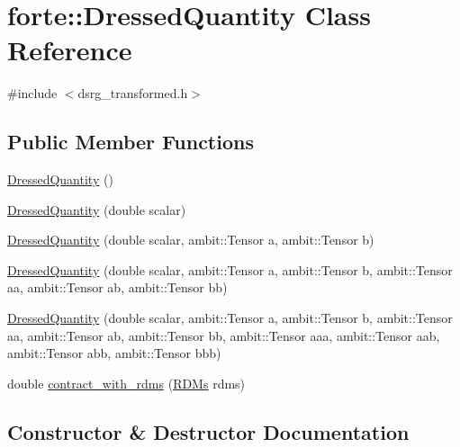\hypertarget{classforte_1_1_dressed_quantity}{}\section{forte\+:\+:Dressed\+Quantity Class Reference}
\label{classforte_1_1_dressed_quantity}


{\ttfamily \#include $<$dsrg\+\_\+transformed.\+h$>$}

\subsection*{Public Member Functions}
\begin{DoxyCompactItemize}
\item 
\mbox{\hyperlink{classforte_1_1_dressed_quantity_a3fa0227d12e055f33566c46750898d10}{Dressed\+Quantity}} ()
\item 
\mbox{\hyperlink{classforte_1_1_dressed_quantity_a7f60134c01eeddca427024865f315d20}{Dressed\+Quantity}} (double scalar)
\item 
\mbox{\hyperlink{classforte_1_1_dressed_quantity_aa3daf37f0ebc740b33f824beb7a92914}{Dressed\+Quantity}} (double scalar, ambit\+::\+Tensor a, ambit\+::\+Tensor b)
\item 
\mbox{\hyperlink{classforte_1_1_dressed_quantity_a13194b9e4e59de0d776ec546d24917a6}{Dressed\+Quantity}} (double scalar, ambit\+::\+Tensor a, ambit\+::\+Tensor b, ambit\+::\+Tensor aa, ambit\+::\+Tensor ab, ambit\+::\+Tensor bb)
\item 
\mbox{\hyperlink{classforte_1_1_dressed_quantity_a8f7a52a1b07c6b79a41db6dd410328f1}{Dressed\+Quantity}} (double scalar, ambit\+::\+Tensor a, ambit\+::\+Tensor b, ambit\+::\+Tensor aa, ambit\+::\+Tensor ab, ambit\+::\+Tensor bb, ambit\+::\+Tensor aaa, ambit\+::\+Tensor aab, ambit\+::\+Tensor abb, ambit\+::\+Tensor bbb)
\item 
double \mbox{\hyperlink{classforte_1_1_dressed_quantity_a349522c7b40185549cd5bc5114d413e7}{contract\+\_\+with\+\_\+rdms}} (\mbox{\hyperlink{classforte_1_1_r_d_ms}{R\+D\+Ms}} rdms)
\end{DoxyCompactItemize}


\subsection{Constructor \& Destructor Documentation}
\mbox{\label{classforte_1_1_dressed_quantity_a3fa0227d12e055f33566c46750898d10}} 

